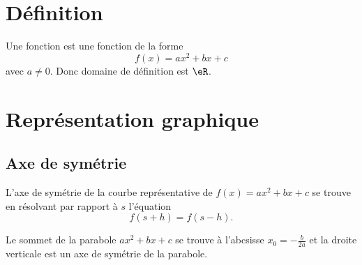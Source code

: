 


\section{Définition}

\begin{definition}
    Une fonction  est une fonction de la forme
    \begin{equation}
        f(x)=ax^2+bx+c
    \end{equation}
    avec \( a\neq 0\). Donc domaine de définition est \( \eR\).
\end{definition}

\section{Représentation graphique}

\subsection{Axe de symétrie}

L'axe de symétrie de la courbe représentative de \( f(x)=ax^2+bx+c\) se trouve en résolvant par rapport à \( s\) l'équation
\begin{equation}
    f(s+h)=f(s-h).
\end{equation}

\begin{Aretenir}
    Le sommet de la parabole \( ax^2+bx+c\) se trouve à l'abcsisse \( x_0=-\frac{ b }{ 2a }\) et la droite verticale est un axe de symétrie de la parabole.
\end{Aretenir}

